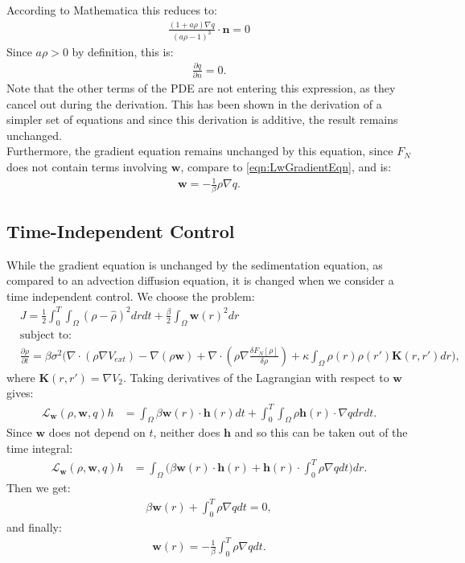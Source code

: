 \documentclass[11pt, a4paper]{article}
\theoremstyle{definition}
\newcommand{\w}{\mathbf{w}}
\newcommand{\n}{\mathbf{n}}
\newcommand{\h}{\mathbf{h}}
\newcommand{\K}{\mathbf{K}}
\begin{document}
According to Mathematica this reduces to:
\begin{align*}
	\frac{(1 + a \rho) \nabla q}{(a \rho -1)^3}\cdot \n = 0
\end{align*}
Since $a \rho >0$ by definition, this is:
\begin{align*}
	\frac{\partial q}{\partial n} = 0.
\end{align*}
Note that the other terms of the PDE are not entering this expression, as they cancel out during the derivation. This has been shown in the derivation of a simpler set of equations and since this derivation is additive, the result remains unchanged.\\
Furthermore, the gradient equation remains unchanged by this equation, since $F_N$ does not contain terms involving $\w$, compare to \eqref{eqn:LwGradientEqn}, and is:
\begin{align*}
	\w = - \frac{1}{\beta}\rho \nabla q.
\end{align*}
\subsection{Time-Independent Control}
While the gradient equation is unchanged by the sedimentation equation, as compared to an advection diffusion equation, it is changed when we consider a time independent control.
We choose the problem:
\begin{align*}
	&J = \frac{1}{2}\int_0^T \int_\Omega (\rho - \widehat \rho)^2 dr dt + \frac{\beta}{2} \int_\Omega \w(r)^2 dr\\
	&\text{subject to:}\\
	&\frac{\partial \rho}{\partial t} = \beta \sigma^2 \bigg( \nabla \cdot (\rho \nabla V_{ext}) - \nabla (\rho \w) + \nabla \cdot \left(\rho \nabla \frac{\delta F_{N}[\rho]}{\delta \rho}\right) + \kappa \int_\Omega \rho(r) \rho(r') \K(r,r')dr\bigg),
\end{align*}
where $\K(r,r') = \nabla V_2$.
Taking derivatives of the Lagrangian with respect to $\w$ gives:
\begin{align}\label{eqn:LwGradientEqn}
	\mathcal{L}_\w(\rho,\w, q)h &= \int_\Omega \beta \w(r) \cdot \h(r) dt + \int_0^T \int_\Omega \rho \h(r) \cdot \nabla q dr dt.
\end{align}
Since $\w$ does not depend on $t$, neither does $\h$ and so this can be taken out of the time integral:
\begin{align*}
	\mathcal{L}_\w(\rho,\w, q)h &= \int_\Omega \bigg( \beta \w(r) \cdot \h(r)  + \h(r) \cdot \int_0^T \rho  \nabla q dt \bigg) dr.
\end{align*}
Then we get:
\begin{align*}
	\beta \w(r)  +  \int_0^T \rho  \nabla q dt = 0,
\end{align*}
and finally:
\begin{align*}
	\w(r) = - \frac{1}{\beta} \int_0^T \rho  \nabla q dt.
\end{align*}
\end{document}
